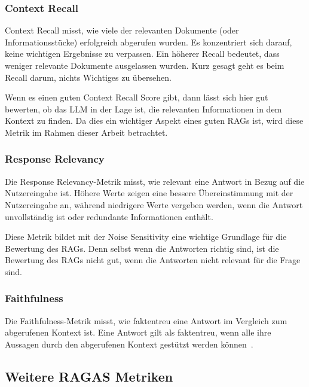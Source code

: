 \subsubsection{Context Recall}
\begin{plainquote}
Context Recall misst, wie viele der relevanten Dokumente (oder Informationsstücke) erfolgreich abgerufen wurden.
Es konzentriert sich darauf, keine wichtigen Ergebnisse zu verpassen.
Ein höherer Recall bedeutet, dass weniger relevante Dokumente ausgelassen wurden.
Kurz gesagt geht es beim Recall darum, nichts Wichtiges zu übersehen.
\cite{ragas_context_recall}
\end{plainquote}

Wenn es einen guten Context Recall Score gibt, dann lässt sich hier gut bewerten, ob das LLM in der Lage ist, die relevanten Informationen in dem Kontext zu finden.
Da dies ein wichtiger Aspekt eines guten RAGs ist, wird diese Metrik im Rahmen dieser Arbeit betrachtet.

\subsubsection{Response Relevancy}
\begin{plainquote}
Die Response Relevancy-Metrik misst, wie relevant eine Antwort in Bezug auf die Nutzereingabe ist. Höhere Werte zeigen eine bessere Übereinstimmung mit der Nutzereingabe an, während niedrigere Werte vergeben werden, wenn die Antwort unvollständig ist oder redundante Informationen enthält.
\cite{ragas_response_relevancy}
\end{plainquote}

Diese Metrik bildet mit der Noise Sensitivity eine wichtige Grundlage für die Bewertung des RAGs.
Denn selbst wenn die Antworten richtig sind, ist die Bewertung des RAGs nicht gut, wenn die Antworten nicht relevant für die Frage sind.

\subsubsection{Faithfulness}
\begin{plainquote}
Die Faithfulness-Metrik misst, wie faktentreu eine Antwort im Vergleich zum abgerufenen Kontext ist.
Eine Antwort gilt als faktentreu, wenn alle ihre Aussagen durch den abgerufenen Kontext gestützt werden können~\cite{ragas_faithfulness}.
\end{plainquote}

\subsection{Weitere RAGAS Metriken}

